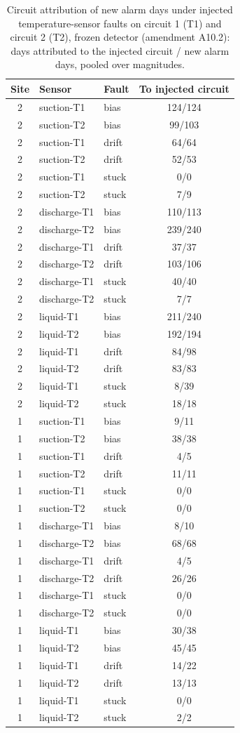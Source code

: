 \begin{table}[h!]\centering\footnotesize\caption{Circuit attribution of new alarm days under injected temperature-sensor faults on circuit 1 (T1) and circuit 2 (T2), frozen detector (amendment A10.2): days attributed to the injected circuit / new alarm days, pooled over magnitudes.}\label{tab:S16}
\begin{tabular}{cllc}\toprule
Site & Sensor & Fault & To injected circuit\\\midrule
2 & suction-T1 & bias & 124/124\\
2 & suction-T2 & bias & 99/103\\
2 & suction-T1 & drift & 64/64\\
2 & suction-T2 & drift & 52/53\\
2 & suction-T1 & stuck & 0/0\\
2 & suction-T2 & stuck & 7/9\\
2 & discharge-T1 & bias & 110/113\\
2 & discharge-T2 & bias & 239/240\\
2 & discharge-T1 & drift & 37/37\\
2 & discharge-T2 & drift & 103/106\\
2 & discharge-T1 & stuck & 40/40\\
2 & discharge-T2 & stuck & 7/7\\
2 & liquid-T1 & bias & 211/240\\
2 & liquid-T2 & bias & 192/194\\
2 & liquid-T1 & drift & 84/98\\
2 & liquid-T2 & drift & 83/83\\
2 & liquid-T1 & stuck & 8/39\\
2 & liquid-T2 & stuck & 18/18\\
1 & suction-T1 & bias & 9/11\\
1 & suction-T2 & bias & 38/38\\
1 & suction-T1 & drift & 4/5\\
1 & suction-T2 & drift & 11/11\\
1 & suction-T1 & stuck & 0/0\\
1 & suction-T2 & stuck & 0/0\\
1 & discharge-T1 & bias & 8/10\\
1 & discharge-T2 & bias & 68/68\\
1 & discharge-T1 & drift & 4/5\\
1 & discharge-T2 & drift & 26/26\\
1 & discharge-T1 & stuck & 0/0\\
1 & discharge-T2 & stuck & 0/0\\
1 & liquid-T1 & bias & 30/38\\
1 & liquid-T2 & bias & 45/45\\
1 & liquid-T1 & drift & 14/22\\
1 & liquid-T2 & drift & 13/13\\
1 & liquid-T1 & stuck & 0/0\\
1 & liquid-T2 & stuck & 2/2\\
\bottomrule\end{tabular}\end{table}
